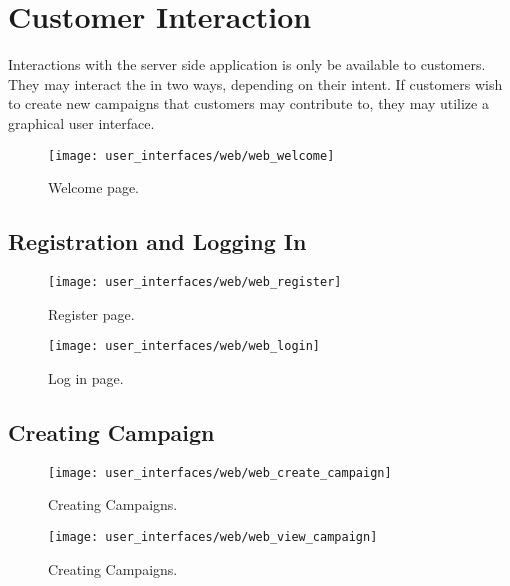 
\section{Customer Interaction}


Interactions with the server side application is only be available to customers. They may interact the in two ways, depending on their intent. If customers wish to create new campaigns that customers may contribute to, they may utilize a graphical user interface. 


\begin{figure}[!htbp]
\centering
\texttt{[image: user\_interfaces/web/web\_welcome]}
\caption{Welcome page.}
\label{fig:web_welcome}
\end{figure}
\FloatBarrier

\subsection{Registration and Logging In}

\begin{figure}[!htbp]
\centering
\texttt{[image: user\_interfaces/web/web\_register]}
\caption{Register page.}
\label{fig:web_register}
\end{figure}
\FloatBarrier

\begin{figure}[!htbp]
\centering
\texttt{[image: user\_interfaces/web/web\_login]}
\caption{Log in page.}
\label{fig:web_login}
\end{figure}
\FloatBarrier

\subsection{Creating Campaign}

\begin{figure}[!htbp]
\centering
\texttt{[image: user\_interfaces/web/web\_create\_campaign]}
\caption{Creating Campaigns.}
\label{fig:web_create_campaign}
\end{figure}
\FloatBarrier

\begin{figure}[!htbp]
\centering
\texttt{[image: user\_interfaces/web/web\_view\_campaign]}
\caption{Creating Campaigns.}
\label{fig:web_view_campaign}
\end{figure}
\FloatBarrier